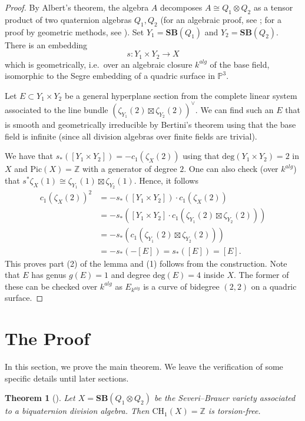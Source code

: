 \documentclass[12pt]{amsart}
\newtheorem{thm}{Theorem}[section]
\theoremstyle{definition}
\newcommand{\CH}{\mathrm{CH}}
\newcommand{\SB}{\mathbf{SB}}
\begin{document}
\begin{proof}
By Albert's theorem, the algebra $A$ decomposes $A\cong Q_1\otimes Q_2$ as a tensor product of two quaternion algebras $Q_1,Q_2$ (for an algebraic proof, see \cite[Theorem 16.1]{MR1632779}; for a proof by geometric methods, see \cite[Theorem 5.5]{MR657430}). Set $Y_1=\SB(Q_1)$ and $Y_2=\SB(Q_2)$. There is an embedding \[s:Y_1\times Y_2\rightarrow X\] which is geometrically, i.e.\ over an algebraic closure $k^{alg}$ of the base field, isomorphic to the Segre embedding of a quadric surface in $\mathbb{P}^3$.

Let $E\subset Y_1\times Y_2$ be a general hyperplane section from the complete linear system associated to the line bundle $(\zeta_{Y_1}(2)\boxtimes \zeta_{Y_2}(2))^\vee$. We can find such an $E$ that is smooth and geometrically irreducible by Bertini's theorem \cite[Th\'eor\`eme 6.10 et Corollaire 6.11]{MR725671} using that the base field is infinite (since all division algebras over finite fields are trivial).

We have that $s_*([Y_1\times Y_2])=-c_1(\zeta_X(2))$ using that $\mathrm{deg}(Y_1\times Y_2)=2$ in $X$ and $\mathrm{Pic}(X)=\mathbb{Z}$ with a generator of degree $2$. 
One can also check (over $k^{alg}$) that $s^*\zeta_X(1)\cong \zeta_{Y_1}(1)\boxtimes \zeta_{Y_2}(1)$. Hence, it follows \begin{align*}c_1(\zeta_X(2))^2 & =-s_*([Y_1\times Y_2])\cdot c_1(\zeta_X(2))\\ &= -s_*([Y_1\times Y_2]\cdot c_1(\zeta_{Y_1}(2)\boxtimes \zeta_{Y_2}(2)))\\ &= -s_*(c_1(\zeta_{Y_1}(2)\boxtimes \zeta_{Y_2}(2))) \\ &=-s_*(-[E])=s_*([E])=[E].
\end{align*} 
This proves part (2) of the lemma and (1) follows from the construction. Note that $E$ has genus $g(E)=1$ and degree $\mathrm{deg}(E)=4$ inside $X$. The former of these can be checked over $k^{alg}$ as $E_{k^{alg}}$ is a curve of bidegree $(2,2)$ on a quadric surface.
\end{proof}



\section{The Proof}
In this section, we prove the main theorem. We leave the verification of some specific details until later sections.

\begin{thm}[{\cite[Proposition 5.1]{MR1615533}}]\label{thm: kar}
Let $X=\SB(Q_1\otimes Q_2)$ be the Severi--Brauer variety associated to a biquaternion division algebra. Then $\CH_1(X)=\mathbb{Z}$ is torsion-free.
\end{thm}
\end{document}
